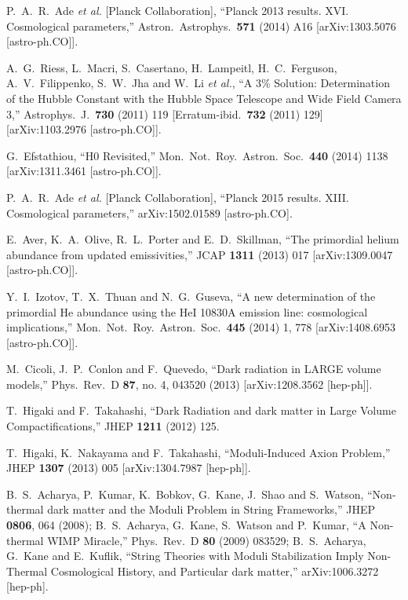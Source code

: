 \documentclass[11pt,a4paper]{article}
\begin{document}
\begin{thebibliography}{99}

  P.~A.~R.~Ade {\it et al.}  [Planck Collaboration],
  ``Planck 2013 results. XVI. Cosmological parameters,''
  Astron.\ Astrophys.\  {\bf 571} (2014) A16
  [arXiv:1303.5076 [astro-ph.CO]].

  A.~G.~Riess, L.~Macri, S.~Casertano, H.~Lampeitl, H.~C.~Ferguson, A.~V.~Filippenko, S.~W.~Jha and W.~Li {\it et al.},
  ``A 3\% Solution: Determination of the Hubble Constant with the Hubble Space Telescope and Wide Field Camera 3,''
  Astrophys.\ J.\  {\bf 730} (2011) 119
   [Erratum-ibid.\  {\bf 732} (2011) 129]
  [arXiv:1103.2976 [astro-ph.CO]].

  G.~Efstathiou,
  ``H0 Revisited,''
  Mon.\ Not.\ Roy.\ Astron.\ Soc.\  {\bf 440} (2014) 1138
  [arXiv:1311.3461 [astro-ph.CO]].

  P.~A.~R.~Ade {\it et al.}  [Planck Collaboration],
  ``Planck 2015 results. XIII. Cosmological parameters,''
  arXiv:1502.01589 [astro-ph.CO].

  E.~Aver, K.~A.~Olive, R.~L.~Porter and E.~D.~Skillman,
  ``The primordial helium abundance from updated emissivities,''
  JCAP {\bf 1311} (2013) 017
  [arXiv:1309.0047 [astro-ph.CO]].

  Y.~I.~Izotov, T.~X.~Thuan and N.~G.~Guseva,
  ``A new determination of the primordial He abundance using the HeI 10830A emission line: cosmological implications,''
  Mon.\ Not.\ Roy.\ Astron.\ Soc.\  {\bf 445} (2014) 1,  778
  [arXiv:1408.6953 [astro-ph.CO]].

M.~Cicoli, J.~P.~Conlon and F.~Quevedo,
  ``Dark radiation in LARGE volume models,''
  Phys.\ Rev.\ D {\bf 87}, no. 4, 043520 (2013)
  [arXiv:1208.3562 [hep-ph]].

T.~Higaki and F.~Takahashi,
  ``Dark Radiation and dark matter in Large Volume Compactifications,''
  JHEP {\bf 1211} (2012) 125.

  T.~Higaki, K.~Nakayama and F.~Takahashi,
  ``Moduli-Induced Axion Problem,''
  JHEP {\bf 1307} (2013) 005
  [arXiv:1304.7987 [hep-ph]].

B.~S.~Acharya, P.~Kumar, K.~Bobkov, G.~Kane, J.~Shao and S.~Watson,
  ``Non-thermal dark matter and the Moduli Problem in String Frameworks,''
  JHEP {\bf 0806}, 064 (2008);
B.~S.~Acharya, G.~Kane, S.~Watson and P.~Kumar,
  ``A Non-thermal WIMP Miracle,''
  Phys.\ Rev.\ D {\bf 80} (2009) 083529;
B.~S.~Acharya, G.~Kane and E.~Kuflik,
  ``String Theories with Moduli Stabilization Imply Non-Thermal Cosmological History, and Particular dark matter,''
  arXiv:1006.3272 [hep-ph].


\end{thebibliography}
\end{document}

